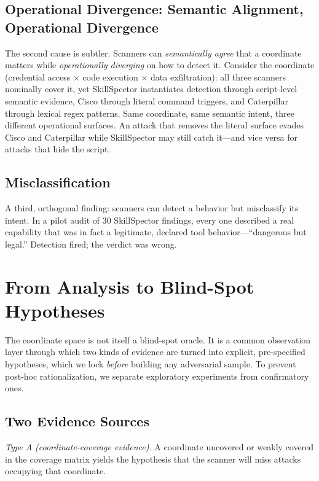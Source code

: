 \documentclass[sigconf,nonacm]{acmart}
\begin{document}
\subsection{Operational Divergence: Semantic Alignment, Operational Divergence}
The second cause is subtler. Scanners can \emph{semantically agree} that a coordinate matters while \emph{operationally diverging} on how to detect it. Consider the coordinate (credential access $\times$ code execution $\times$ data exfiltration): all three scanners nominally cover it, yet SkillSpector instantiates detection through script-level semantic evidence, Cisco through literal command triggers, and Caterpillar through lexical regex patterns. Same coordinate, same semantic intent, three different operational surfaces. An attack that removes the literal surface evades Cisco and Caterpillar while SkillSpector may still catch it---and vice versa for attacks that hide the script.

\subsection{Misclassification}
A third, orthogonal finding: scanners can detect a behavior but misclassify its intent. In a pilot audit of 30 SkillSpector findings, every one described a real capability that was in fact a legitimate, declared tool behavior---``dangerous but legal.'' Detection fired; the verdict was wrong.

\section{From Analysis to Blind-Spot Hypotheses}
\label{sec:hypotheses}

The coordinate space is not itself a blind-spot oracle. It is a common observation layer through which two kinds of evidence are turned into explicit, pre-specified hypotheses, which we lock \emph{before} building any adversarial sample. To prevent post-hoc rationalization, we separate exploratory experiments from confirmatory ones.

\subsection{Two Evidence Sources}
\emph{Type A (coordinate-coverage evidence).} A coordinate uncovered or weakly covered in the coverage matrix yields the hypothesis that the scanner will miss attacks occupying that coordinate.
\end{document}
